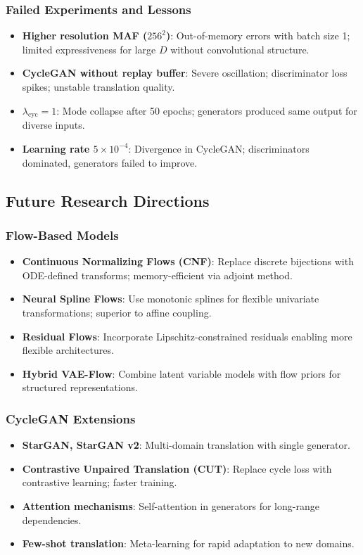 \documentclass[conference]{IEEEtran}
\begin{document}
\subsubsection{Failed Experiments and Lessons}
\begin{itemize}
\item \textbf{Higher resolution MAF ($256^2$)}: Out-of-memory errors with batch size 1; limited expressiveness for large $D$ without convolutional structure.
\item \textbf{CycleGAN without replay buffer}: Severe oscillation; discriminator loss spikes; unstable translation quality.
\item \textbf{$\lambda_{\text{cyc}} = 1$}: Mode collapse after 50 epochs; generators produced same output for diverse inputs.
\item \textbf{Learning rate $5 \times 10^{-4}$}: Divergence in CycleGAN; discriminators dominated, generators failed to improve.
\end{itemize}

\subsection{Future Research Directions}
\subsubsection{Flow-Based Models}
\begin{itemize}
\item \textbf{Continuous Normalizing Flows (CNF)}: Replace discrete bijections with ODE-defined transforms; memory-efficient via adjoint method.
\item \textbf{Neural Spline Flows}: Use monotonic splines for flexible univariate transformations; superior to affine coupling.
\item \textbf{Residual Flows}: Incorporate Lipschitz-constrained residuals enabling more flexible architectures.
\item \textbf{Hybrid VAE-Flow}: Combine latent variable models with flow priors for structured representations.
\end{itemize}

\subsubsection{CycleGAN Extensions}
\begin{itemize}
\item \textbf{StarGAN, StarGAN v2}: Multi-domain translation with single generator.
\item \textbf{Contrastive Unpaired Translation (CUT)}: Replace cycle loss with contrastive learning; faster training.
\item \textbf{Attention mechanisms}: Self-attention in generators for long-range dependencies.
\item \textbf{Few-shot translation}: Meta-learning for rapid adaptation to new domains.
\end{itemize}
\end{document}
